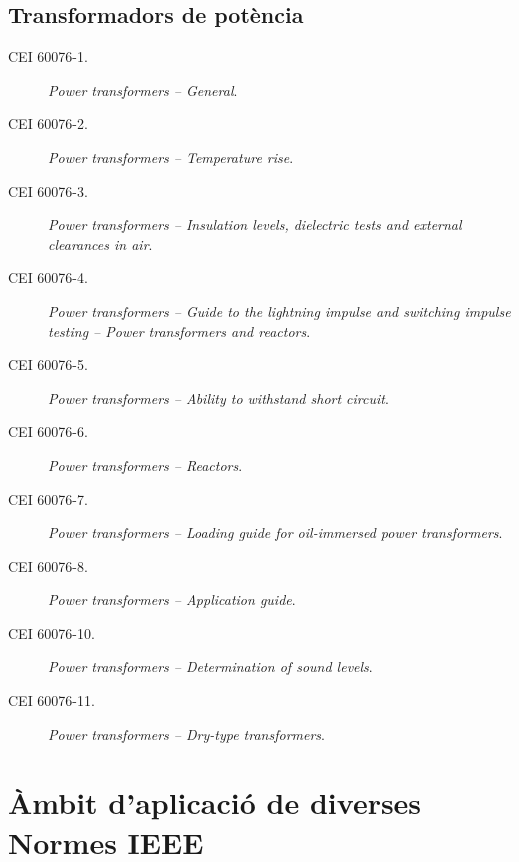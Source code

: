 \subsection*{Transformadors de potència}
\begin{description}
    \item [\hspace{5mm}CEI 60076-1.] \textit{Power transformers -- General}.
    \item [\hspace{5mm}CEI 60076-2.] \textit{Power transformers -- Temperature rise}.
    \item [\hspace{5mm}CEI 60076-3.] \textit{Power transformers -- Insulation levels, dielectric tests and external clearances in air}.
    \item [\hspace{5mm}CEI 60076-4.] \textit{Power transformers -- Guide to the lightning impulse and switching impulse testing -- Power transformers and reactors}.
    \item [\hspace{5mm}CEI 60076-5.] \textit{Power transformers -- Ability to withstand short circuit}.
    \item [\hspace{5mm}CEI 60076-6.] \textit{Power transformers -- Reactors}.
    \item [\hspace{5mm}CEI 60076-7.] \textit{Power transformers -- Loading guide for oil-immersed power transformers}.
    \item [\hspace{5mm}CEI 60076-8.] \textit{Power transformers -- Application guide}.
    \item [\hspace{5mm}CEI 60076-10.] \textit{Power transformers -- Determination of sound levels}.
    \item [\hspace{5mm}CEI 60076-11.] \textit{Power transformers -- Dry-type transformers}.
\end{description}


\section{Àmbit d'aplicació de diverses Normes IEEE}\label{sec:normes_IEEE}

